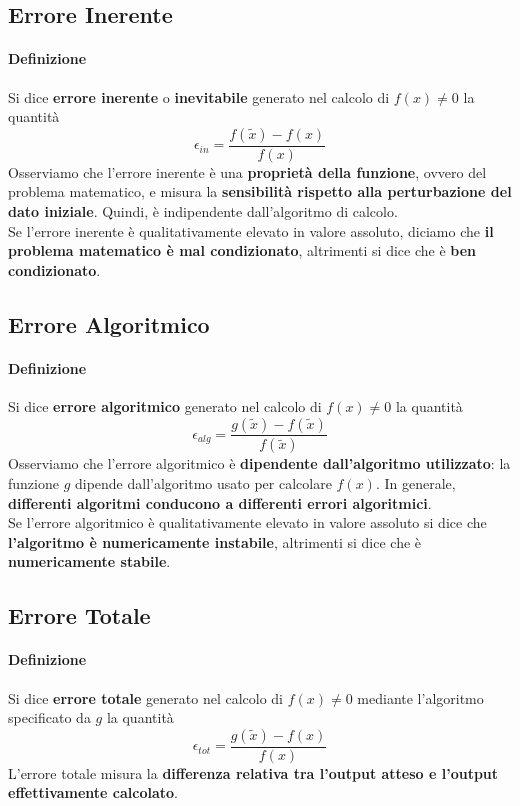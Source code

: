 \documentclass[10pt]{book}
\begin{document}
\subsection{Errore Inerente}
\paragraph{Definizione} Si dice \textbf{errore inerente} o \textbf{inevitabile} generato nel calcolo di $f(x) \neq 0$ la quantità $$\epsilon_{in} = \frac{f(\tilde{x}) - f(x)}{f(x)}$$
Osserviamo che l'errore inerente è una \textbf{proprietà della funzione}, ovvero del problema matematico, e misura la \textbf{sensibilità rispetto alla perturbazione del dato iniziale}. Quindi, è indipendente dall'algoritmo di calcolo.\\
Se l'errore inerente è qualitativamente elevato in valore assoluto, diciamo che \textbf{il problema matematico è mal condizionato}, altrimenti si dice che è \textbf{ben condizionato}.
\subsection{Errore Algoritmico}
\paragraph{Definizione} Si dice \textbf{errore algoritmico} generato nel calcolo di $f(x) \neq 0$ la quantità $$\epsilon_{alg} = \frac{g(\tilde{x}) - f(\tilde{x})}{f(\tilde{x})}$$
Osserviamo che l'errore algoritmico è \textbf{dipendente dall'algoritmo utilizzato}: la funzione $g$ dipende dall'algoritmo usato per calcolare $f(x)$. In generale, \textbf{differenti algoritmi conducono a differenti errori algoritmici}.\\
Se l'errore algoritmico è qualitativamente elevato in valore assoluto si dice che \textbf{l'algoritmo è numericamente instabile}, altrimenti si dice che è \textbf{numericamente stabile}.
\subsection{Errore Totale}
\paragraph{Definizione} Si dice \textbf{errore totale} generato nel calcolo di $f(x) \neq 0$ mediante l'algoritmo specificato da $g$ la quantità $$\epsilon_{tot} = \frac{g(\tilde{x}) - f(x)}{f(x)}$$ L'errore totale misura la \textbf{differenza relativa tra l'output atteso e l'output effettivamente calcolato}.
\end{document}
